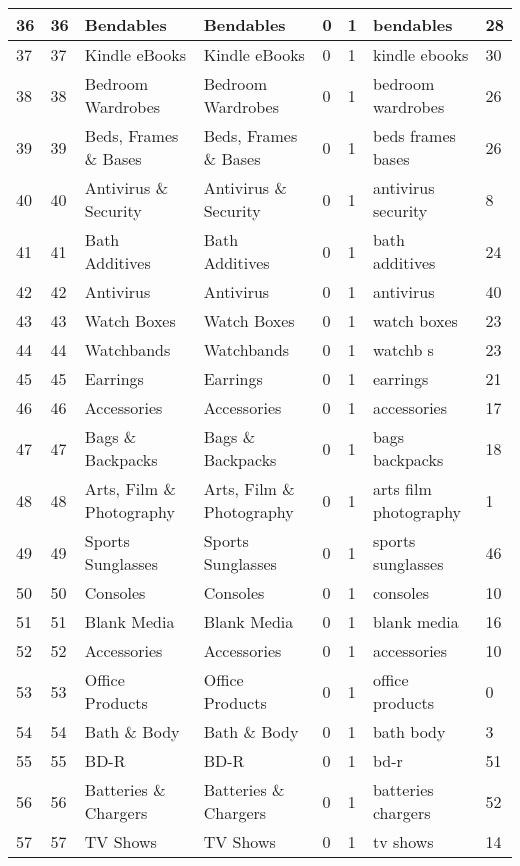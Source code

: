 \begin{longtable}{|l|l|l|l|l|l|l|l|}
36 & 36 & Bendables & Bendables & 0 & 1 & bendables & 28 \\ \hline 
37 & 37 & Kindle eBooks & Kindle eBooks & 0 & 1 & kindle ebooks & 30 \\ \hline 
38 & 38 & Bedroom Wardrobes & Bedroom Wardrobes & 0 & 1 & bedroom wardrobes & 26 \\ \hline 
39 & 39 & Beds, Frames \& Bases & Beds, Frames \& Bases & 0 & 1 & beds frames bases & 26 \\ \hline 
40 & 40 & Antivirus \& Security & Antivirus \& Security & 0 & 1 & antivirus security & 8 \\ \hline 
41 & 41 & Bath Additives & Bath Additives & 0 & 1 & bath additives & 24 \\ \hline 
42 & 42 & Antivirus & Antivirus & 0 & 1 & antivirus & 40 \\ \hline 
43 & 43 & Watch Boxes & Watch Boxes & 0 & 1 & watch boxes & 23 \\ \hline 
44 & 44 & Watchbands & Watchbands & 0 & 1 & watchb s & 23 \\ \hline 
45 & 45 & Earrings & Earrings & 0 & 1 & earrings & 21 \\ \hline 
46 & 46 & Accessories & Accessories & 0 & 1 & accessories & 17 \\ \hline 
47 & 47 & Bags \& Backpacks & Bags \& Backpacks & 0 & 1 & bags backpacks & 18 \\ \hline 
48 & 48 & Arts, Film \& Photography & Arts, Film \& Photography & 0 & 1 & arts film photography & 1 \\ \hline 
49 & 49 & Sports Sunglasses & Sports Sunglasses & 0 & 1 & sports sunglasses & 46 \\ \hline 
50 & 50 & Consoles & Consoles & 0 & 1 & consoles & 10 \\ \hline 
51 & 51 & Blank Media & Blank Media & 0 & 1 & blank media & 16 \\ \hline 
52 & 52 & Accessories & Accessories & 0 & 1 & accessories & 10 \\ \hline 
53 & 53 & Office Products & Office Products & 0 & 1 & office products & 0 \\ \hline 
54 & 54 & Bath \& Body & Bath \& Body & 0 & 1 & bath body & 3 \\ \hline 
55 & 55 & BD-R & BD-R & 0 & 1 & bd-r & 51 \\ \hline 
56 & 56 & Batteries \& Chargers & Batteries \& Chargers & 0 & 1 & batteries chargers & 52 \\ \hline 
57 & 57 & TV Shows & TV Shows & 0 & 1 & tv shows & 14 \\ \hline 

\end{longtable}
